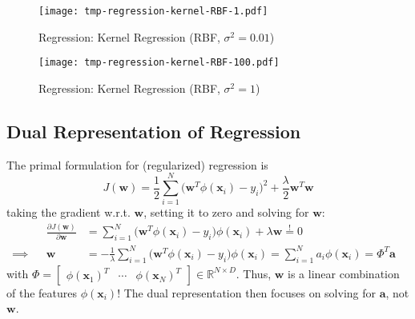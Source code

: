 \documentclass[a4paper, 11pt, accentcolor = tud3b]{tudreport}
\newcommand{\R}{\ensuremath{\mathbb{R}}}
\renewcommand{\vec}[1]{\mathbf{#1}}
\begin{document}
				\begin{figure}
					\centering
					\texttt{[image: tmp-regression-kernel-RBF-1.pdf]}
					\caption{Regression: Kernel Regression (RBF, \( \sigma^2 = 0.01 \))}
					\label{fig:regressionKernelA}
				\end{figure}
				\begin{figure}
					\centering
					\texttt{[image: tmp-regression-kernel-RBF-100.pdf]}
					\caption{Regression: Kernel Regression (RBF, \( \sigma^2 = 1 \))}
					\label{fig:regressionKernelB}
				\end{figure}

			\subsection{Dual Representation of Regression}
				The primal formulation for (regularized) regression is
				\begin{equation}
					J(\vec{w}) = \frac{1}{2} \sum_{i = 1}^{N} \big( \vec{w}^T \phi(\vec{x}_i) - y_i \big)^2 + \frac{\lambda}{2} \vec{w}^T \vec{w}
				\end{equation}
				taking the gradient w.r.t. \( \vec{w} \), setting it to zero and solving for \(\vec{w}\):
				\begin{align}
					&& \frac{\partial J(\vec{w})}{\partial \vec{w}} &= \sum_{i = 1}^{N} \big(\vec{w}^T \phi(\vec{x}_i) - y_i\big) \phi(\vec{x}_i) + \lambda \vec{w} \overset{!}{=} 0 & \\
					\implies && \vec{w} &= -\frac{1}{\lambda} \sum_{i = 1}^{N} \big( \vec{w}^T \phi(\vec{x}_i) - y_i \big) \phi(\vec{x}_i) = \sum_{i = 1}^{N} a_i \phi(\vec{x}_i) = \Phi^T \vec{a}
				\end{align}
				with \( \Phi = \begin{bmatrix} \phi(\vec{x}_1)^T & \cdots & \phi(\vec{x}_N)^T \end{bmatrix} \in \R^{N \times D} \). Thus, \(\vec{w}\) is a linear combination of the features \(\phi(\vec{x}_i)\)! The dual representation then focuses on solving for \(\vec{a}\), not \(\vec{w}\).
				
\end{document}
